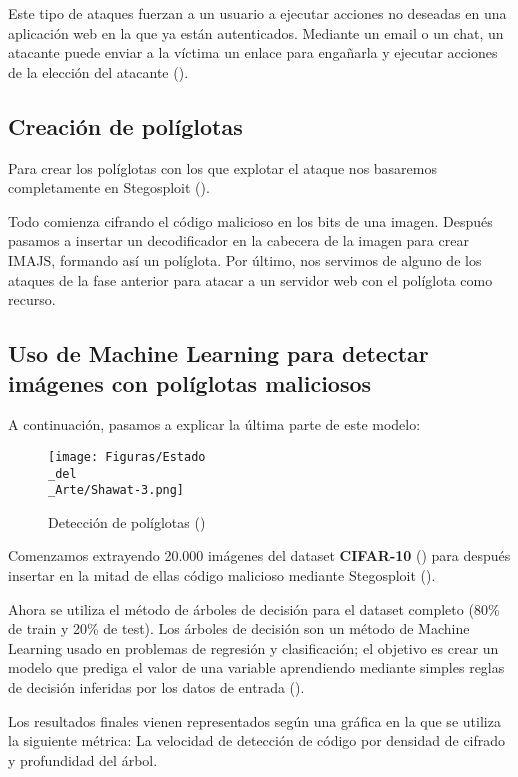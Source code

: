 Este tipo de ataques fuerzan a un usuario a ejecutar acciones no deseadas en una aplicación web en la que ya están autenticados. Mediante un email o un chat, un atacante puede enviar a la víctima un enlace para engañarla y ejecutar acciones de la elección del atacante (\cite{csrf}). %

\subsection{Creación de políglotas}

Para crear los políglotas con los que explotar el ataque nos basaremos completamente en Stegosploit (\cite{stegosploit}).

Todo comienza cifrando el código malicioso en los bits de una imagen. Después pasamos a insertar un decodificador en la cabecera de la imagen para crear IMAJS, formando así un políglota. Por último, nos servimos de alguno de los ataques de la fase anterior para atacar a un servidor web con el políglota como recurso.

\subsection{Uso de Machine Learning para detectar imágenes con políglotas maliciosos}

A continuación, pasamos a explicar la última parte de este modelo:

\begin{figure}[H]
  \centering
  \texttt{[image: Figuras/Estado\\\_del\\\_Arte/Shawat-3.png]}
  \label{fig:shawat-3}
  \caption{Detección de políglotas (\cite{ml-stenography-shawat})}
\end{figure}

Comenzamos extrayendo 20.000 imágenes del dataset \textbf{CIFAR-10} (\cite{cifar10}) para después insertar en la mitad de ellas código malicioso mediante Stegosploit (\cite{stegosploit}). %

Ahora se utiliza el método de árboles de decisión para el dataset completo (80\% de train y 20\% de test). Los árboles de decisión son un método de Machine Learning usado en problemas de regresión y clasificación; el objetivo es crear un modelo que prediga el valor de una variable aprendiendo mediante simples reglas de decisión inferidas por los datos de entrada (\cite{decision-trees}). %

Los resultados finales vienen representados según una gráfica en la que se utiliza la siguiente métrica: La velocidad de detección de código por densidad de cifrado y profundidad del árbol.

